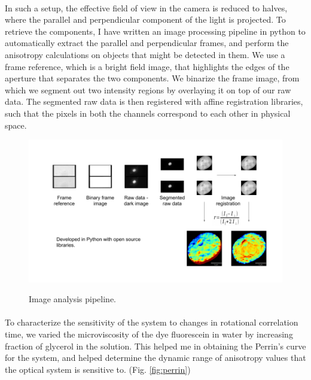 \paragraph*{} In such a setup, the effective field of view in the camera is reduced to halves, where the parallel and perpendicular component of the light is projected. To retrieve the components, I have written an image processing pipeline in python to automatically extract the parallel and perpendicular frames, and perform the anisotropy calculations on objects that might be detected in them. We use a frame reference, which is a bright field image, that highlights the edges of the aperture that separates the two components. We binarize the frame image, from which we segment out two intensity regions by overlaying it on top of our raw data. The segmented raw data is then registered with affine registration libraries, such that the pixels in both the channels correspond to each other in physical space.

\begin{figure}[!htp]
    {\hfill\includegraphics[clip,width=1\linewidth]{figures/pipeline.png}\hspace*{\fill}}
    \caption{Image analysis pipeline.}
    {\label{fig:pipeline}}
\end{figure}

\paragraph*{} To characterize the sensitivity of the system to changes in rotational correlation time, we varied the microviscosity of the dye fluorescein in water by increasing fraction of glycerol in the solution. This helped me in obtaining the Perrin's curve for the system, and helped determine the dynamic range of anisotropy values that the optical system is sensitive to. (Fig. \ref{fig:perrin})


